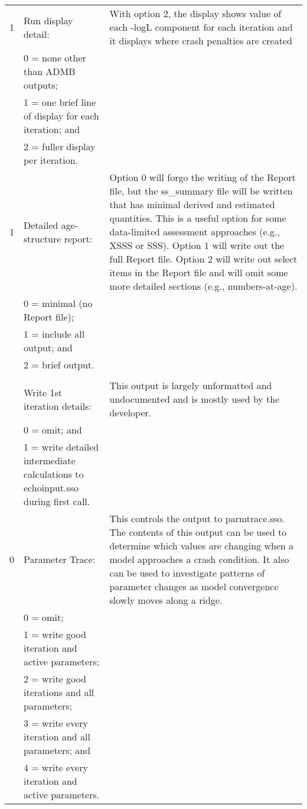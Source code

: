 {\begin{landscape}
\begin{longtable}{p{1.5cm} p{7.2cm} p{12.3cm}}
 \hline
 1 & Run display detail: &  \multirow{1}{1cm}[-0.25cm]{\parbox{12.5cm}{With option 2, the display shows value of each -logL component for each iteration and it displays where crash penalties are created}} \Tstrut\\
   & 0 = none other than ADMB outputs; & \\
   & 1 = one brief line of display for each iteration; and & \\
   & 2 = fuller display per iteration. & \\
		  
 \hline
 1 & Detailed age-structure report: & \multirow{1}{1cm}[-0.15cm]{\parbox{12.5cm}{Option 0 will forgo the writing of the Report file, but the ss\_summary file will be written that has minimal derived and estimated quantities. This is a useful option for some data-limited assessment approaches (e.g., XSSS or SSS). Option 1 will write out the full Report file. Option 2 will write out select items in the Report file and will omit some more detailed sections (e.g., numbers-at-age).}} \Tstrut\\
   & 0 = minimal (no Report file); & \\
   & 1 = include all output; and &  \\
   & 2 = brief output. &  \\	
   & & \\	 
		 
 \pagebreak%
 0 & Write 1st iteration details: & \multirow{1}{1cm}[-0.25cm]{\parbox{12.5cm}{This output is largely unformatted and undocumented and is mostly used by the developer. }} \Tstrut\\
   & 0 = omit; and & \\
   & 1 = write detailed intermediate calculations to echoinput.sso during first call. & \\

 \hline
 0 & Parameter Trace: & \multirow{1}{1cm}[-0.25cm]{\parbox{12.5cm}{This controls the output to parmtrace.sso. The contents of this output can be used to determine which values are changing when a model approaches a crash condition.  It also can be used to investigate patterns of parameter changes as model convergence slowly moves along a ridge.}} \Tstrut\\
   & 0 = omit; & \\
   & 1 = write good iteration and active parameters; & \\
   & 2 = write good iterations and all parameters; & \\
   & 3 = write every iteration and all parameters; and & \\
   & 4 = write every iteration and active parameters. &  \\
   

\end{longtable}
\end{landscape}}
